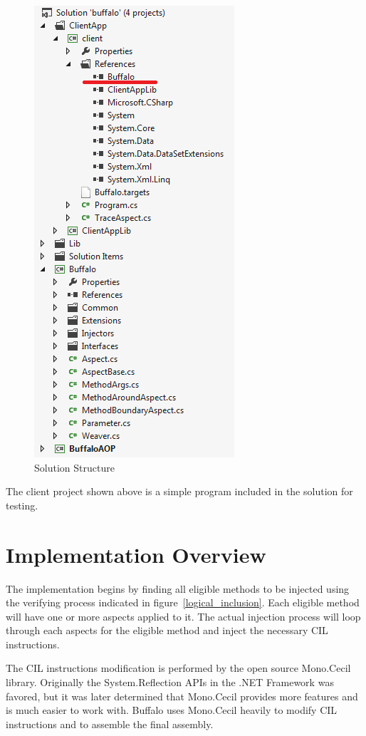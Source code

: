 \begin{figure}[H]
  \includegraphics[scale=1.0]{SolutionExplorer2.PNG}
  \centering
  \caption{Solution Structure\label{solutionexplorer}}
\end{figure}

The client project shown above is a simple program included in the solution for testing.

\section{Implementation Overview}

The implementation begins by finding all eligible methods to be injected using the verifying process indicated in figure~\ref{logical_inclusion}. Each eligible method will have one or more aspects applied to it. The actual injection process will loop through each aspects for the eligible method and inject the necessary CIL instructions.

The CIL instructions modification is performed by the open source Mono.Cecil library. Originally the System.Reflection APIs in the .NET Framework was favored, but it was later determined that Mono.Cecil provides more features and is much easier to work with. Buffalo uses Mono.Cecil heavily to modify CIL instructions and to assemble the final assembly.

